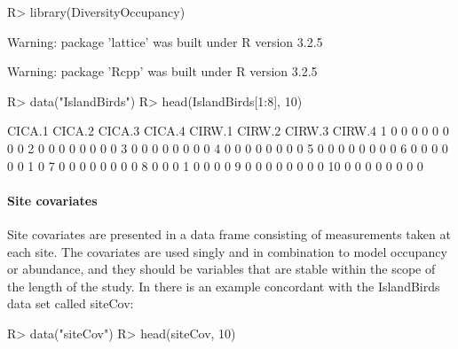 \documentclass[article]{jss}
\begin{document}
\begin{CodeChunk}

\begin{CodeInput}
R> library(DiversityOccupancy)
\end{CodeInput}

\begin{CodeOutput}
Warning: package 'lattice' was built under R version 3.2.5
\end{CodeOutput}

\begin{CodeOutput}
Warning: package 'Rcpp' was built under R version 3.2.5
\end{CodeOutput}

\begin{CodeInput}
R> data("IslandBirds")
R> head(IslandBirds[1:8], 10)
\end{CodeInput}

\begin{CodeOutput}
   CICA.1 CICA.2 CICA.3 CICA.4 CIRW.1 CIRW.2 CIRW.3 CIRW.4
1       0      0      0      0      0      0      0      0
2       0      0      0      0      0      0      0      0
3       0      0      0      0      0      0      0      0
4       0      0      0      0      0      0      0      0
5       0      0      0      0      0      0      0      0
6       0      0      0      0      0      0      1      0
7       0      0      0      0      0      0      0      0
8       0      0      0      1      0      0      0      0
9       0      0      0      0      0      0      0      0
10      0      0      0      0      0      0      0      0
\end{CodeOutput}
\end{CodeChunk}

\paragraph{Site covariates}\label{site-covariates}

Site covariates are presented in a data frame consisting of measurements
taken at each site. The covariates are used singly and in combination to
model occupancy or abundance, and they should be variables that are
stable within the scope of the length of the study. In
 there is an example concordant with the
IslandBirds data set called siteCov:

\begin{CodeChunk}

\begin{CodeInput}
R> data("siteCov")
R> head(siteCov, 10)
\end{CodeInput}
\end{CodeChunk}
\end{document}
